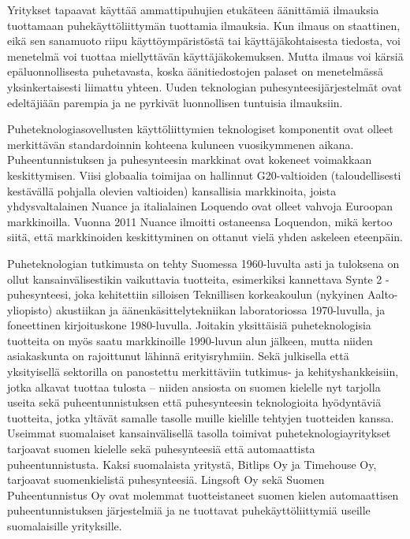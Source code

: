 \documentclass[]{../../metanetpaper}
\begin{document}
\begin{multicols}{2}
Yritykset tapaavat käyttää ammattipuhujien etukäteen äänittämiä
ilmauksia tuottamaan puhekäyttöliittymän tuottamia ilmauksia. Kun
ilmaus on staattinen, eikä sen sanamuoto riipu käyttöympäristöstä tai
käyttäjäkohtaisesta tiedosta, voi menetelmä voi tuottaa miellyttävän
käyttäjäkokemuksen. Mutta ilmaus voi kärsiä epäluonnollisesta puhetavasta, 
koska äänitiedostojen palaset on menetelmässä yksinkertaisesti liimattu yhteen. 
Uuden teknologian puhesynteesijärjestelmät ovat edeltäjiään parempia ja 
ne pyrkivät luonnollisen tuntuisia ilmauksiin.

Puheteknologiasovellusten käyttöliittymien teknologiset komponentit
ovat olleet merkittävän standardoinnin kohteena kuluneen vuosikymmenen
aikana. Puheentunnistuksen ja puhesynteesin markkinat ovat kokeneet
voimakkaan keskittymisen. Viisi globaalia toimijaa on hallinnut G20-valtioiden 
(taloudellisesti kestävällä pohjalla olevien valtioiden) kansallisia markkinoita, 
joista yhdysvaltalainen Nuance ja italialainen Loquendo ovat olleet vahvoja Euroopan
markkinoilla. Vuonna 2011 Nuance ilmoitti ostaneensa Loquendon, mikä
kertoo siitä, että markkinoiden keskittyminen on ottanut vielä yhden
askeleen eteenpäin.

Puheteknologian tutkimusta on tehty Suomessa 1960-luvulta asti ja
tuloksena on ollut kansainvälisestikin vaikuttavia tuotteita,
esimerkiksi kannettava Synte 2 -puhesynteesi, joka kehitettiin
silloisen Teknillisen korkeakoulun (nykyinen Aalto-yliopisto)
akustiikan ja äänenkäsittelytekniikan laboratoriossa 1970-luvulla, ja
foneettinen kirjoituskone 1980-luvulla. Joitakin yksittäisiä
puheteknologisia tuotteita on myös saatu markkinoille 1990-luvun alun
jälkeen, mutta niiden asiakaskunta on rajoittunut lähinnä
erityisryhmiin. Sekä julkisella että yksityisellä sektorilla on panostettu 
merkittäviin tutkimus- ja kehityshankkeisiin, jotka alkavat tuottaa tulosta 
– niiden ansiosta on suomen kielelle
nyt tarjolla useita sekä puheentunnistuksen että puhesynteesin
teknologioita hyödyntäviä tuotteita, jotka yltävät samalle tasolle
muille kielille tehtyjen tuotteiden kanssa. Useimmat suomalaiset
kansainvälisellä tasolla toimivat puheteknologiayritykset tarjoavat
suomen kielelle sekä puhesynteesiä että automaattista
puheentunnistusta. Kaksi suomalaista yritystä, Bitlips Oy ja Timehouse
Oy, tarjoavat suomenkielistä puhesynteesiä. Lingsoft Oy sekä Suomen
Puheentunnistus Oy ovat molemmat tuotteistaneet suomen kielen
automaattisen puheentunnistuksen järjestelmiä ja ne tuottavat
puhekäyttöliittymiä useille suomalaisille yrityksille.


\end{multicols}
\end{document}
